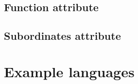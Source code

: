 		\subsection{Function attribute} \label{s:composition-viewpoint-template:function-attribute}
			\begin{comment}
				A statement of what the entity does. The function attribute states the transformation applied by the entity to
				its inputs to produce the output. In the case of a data entity, this attribute states the type of information
				stored or transmitted by the entity.
				
				NOTE—This design attribute is retained for compatibility with IEEE Std 1016-1998.
			\end{comment}
		
		\subsection{Subordinates attribute} \label{s:subordinates-viewpoint-template:function-attribute}
			\begin{comment}
				The identification of all entities composing this entity. The subordinates attribute identifies the “composed
				of” relationship for an entity. This information is used to trace requirements to design entities and to
				identify parent/child structural relationships through a design subject.
			
				NOTE—This design attribute is retained for compatibility with IEEE Std 1016-1998. An equivalent capability is
				available through the composition relationship.
			\end{comment}
			
	\section{Example languages} \label{s:composition-viewpoint-template:example-languages}
		\begin{comment}
			UML component diagrams (see OMG [B28]) cover this viewpoint. The simplest graphical technique used
			to describe functional system decomposition is a hierarchical decomposition diagram; such diagram can be
			used together with natural language descriptions of purpose and function for each entity, such as is
			provided by IDEF0 (IEEE Std 1320.1-1998 [B18]), the Structure Chart (Yourdon and Constantine [B38],
			and the HIPO Diagram. Run-time composition can also use structured diagrams (Page-Jones [B29]).
		\end{comment}